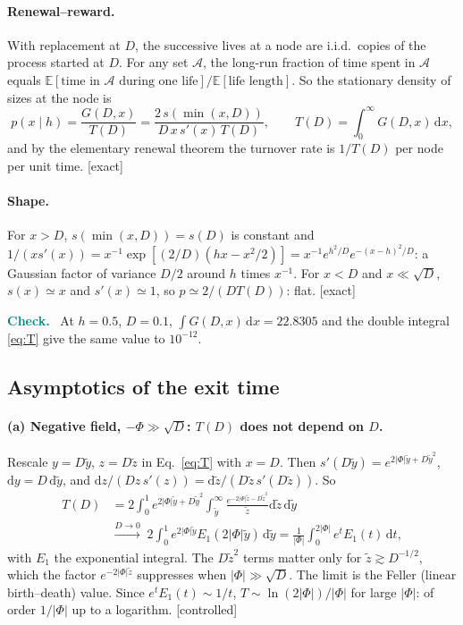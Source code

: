 \documentclass[11pt]{article}
\newcommand{\E}{\mathbb E}
\newcommand{\dd}{\mathrm d}
\newcommand{\exact}{\textsf{\small[exact]}}
\newcommand{\controlled}{\textsf{\small[controlled]}}
\newenvironment{verify}{\par\medskip\noindent\textcolor{teal}{\textbf{Check.}}\ }{\par\medskip}
\begin{document}
\paragraph{Renewal--reward.}  With replacement at $D$, the successive lives at a node are i.i.d.\ copies of the
process started at $D$.  For any set $\mathcal A$, the long-run fraction of time spent in $\mathcal A$ equals
$\E[\text{time in }\mathcal A\text{ during one life}]/\E[\text{life length}]$.  So the stationary density of sizes at the node is
\begin{equation}
\boxed{p(x\mid h)=\frac{G(D,x)}{T(D)}=\frac{2\,s(\min(x,D))}{D\,x\,s'(x)\,T(D)},\qquad T(D)=\int_0^\infty G(D,x)\,\dd x,}
\label{eq:renewal}
\end{equation}
and by the elementary renewal theorem the turnover rate is $1/T(D)$ per node per unit time.  \exact

\paragraph{Shape.}  For $x>D$, $s(\min(x,D))=s(D)$ is constant and
$1/(xs'(x))=x^{-1}\exp[(2/D)(hx-x^2/2)]=x^{-1}e^{h^2/D}e^{-(x-h)^2/D}$: a Gaussian factor of variance $D/2$ around
$h$ times $x^{-1}$.  For $x<D$ and $x\ll\sqrt D$, $s(x)\simeq x$ and $s'(x)\simeq1$, so $p\simeq2/(DT(D))$: flat.  \exact

\begin{verify}
At $h=0.5$, $D=0.1$, $\int G(D,x)\,\dd x=22.8305$ and the double integral \eqref{eq:T} give the same value to $10^{-12}$.
\end{verify}

\subsection{Asymptotics of the exit time}

\paragraph{(a) Negative field, $-\Phi\gg\sqrt D$: $T(D)$ does not depend on $D$.}  Rescale $y=D\tilde y$, $z=D\tilde z$ in
Eq.~\eqref{eq:T} with $x=D$.  Then $s'(D\tilde y)=e^{2|\Phi|\tilde y+D\tilde y^2}$, $\dd y=D\,\dd\tilde y$, and
$\dd z/(Dz\,s'(z))=\dd\tilde z/(D\tilde z\,s'(D\tilde z))$.  So
\begin{equation}
\begin{aligned}
T(D)&=2\int_0^1e^{2|\Phi|\tilde y+D\tilde y^2}\int_{\tilde y}^\infty\frac{e^{-2|\Phi|\tilde z-D\tilde z^2}}{\tilde z}\dd\tilde z\,\dd\tilde y\\
&\xrightarrow{D\to0}\;2\int_0^1e^{2|\Phi|\tilde y}E_1(2|\Phi|\tilde y)\,\dd\tilde y
=\frac1{|\Phi|}\int_0^{2|\Phi|}e^tE_1(t)\,\dd t ,
\end{aligned}
\end{equation}
with $E_1$ the exponential integral.  The $D\tilde z^2$ terms matter only for $\tilde z\gtrsim D^{-1/2}$, which the factor
$e^{-2|\Phi|\tilde z}$ suppresses when $|\Phi|\gg\sqrt D$.  The limit is the Feller (linear birth--death) value.  Since $e^tE_1(t)\sim1/t$,
$T\sim\ln(2|\Phi|)/|\Phi|$ for large $|\Phi|$: of order $1/|\Phi|$ up to a logarithm.  \controlled
\end{document}
